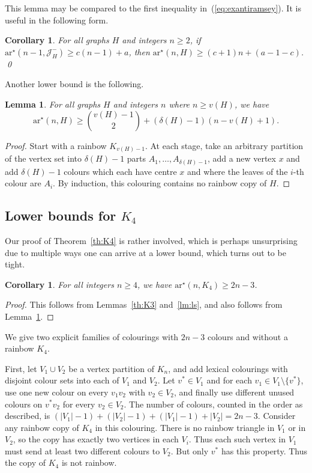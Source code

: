 \documentclass[a4paper, 12pt]{article}
\numberwithin{equation}{section}
\newtheorem{corollary}[theorem]{Corollary}
\newtheorem{lemma}[theorem]{Lemma}
\def\sm{{\setminus}}
\def\sar{{\mathrm{ar}^{\star}}}
\newcommand{\mc}[1]{\mathcal{#1}}
\begin{document}
This lemma may be compared to the first inequality in~(\ref{eq:exantiramsey}).
It is useful in the following form. 

\begin{corollary}
	For all graphs $H$ and integers $n \geq 2$, if $\sar(n-1,\mc{J}^-_H)\geq c (n-1)+a$, then $\sar(n,H)\geq (c+1)n+(a-1-c)$.
    \hfill\qed
\end{corollary}


Another lower bound is the following.

\begin{lemma}\label{lm:lowerbd2}
    For all graphs $H$ and integers $n$ where $n \geq v(H)$, we have
    $$
    \sar(n,H) \geq \binom{v(H)-1}{2}+(\delta(H)-1)(n-v(H)+1).
    $$
\end{lemma}

\begin{proof}
    Start with a rainbow $K_{v(H)-1}$. At each stage, take an arbitrary partition of the vertex set into $\delta(H)-1$ parts $A_1,\ldots,A_{\delta(H)-1}$, add a new vertex $x$ and add $\delta(H)-1$ colours which each have centre $x$ and where the leaves of the $i$-th colour are $A_i$. By induction, this colouring contains no rainbow copy of $H$.
\end{proof}

\subsection{Lower bounds for $K_4$}\label{sec:K4lower}

Our proof of Theorem~\ref{th:K4} is rather involved, which is perhaps unsurprising due to multiple ways one can arrive at a lower bound, which turns out to be tight.

\begin{corollary}\label{cor:K4}
	  For all integers $n \geq 4$, we have $\sar(n,K_4)\geq  2n -3$.
\end{corollary}

\begin{proof}
    This follows from Lemmas~\ref{th:K3} and~\ref{lm:ls},
    and also follows from Lemma~\ref{lm:lowerbd2}.
\end{proof}


We give two explicit families of colourings with $2n-3$ colours and without a rainbow $K_4$.


First, let $V_1 \cup V_2$ be a vertex partition of $K_n$, and add lexical colourings with disjoint colour sets into each of $V_1$ and $V_2$. Let $v^* \in V_1$ and for each $v_1 \in V_1\sm\{v^*\}$, use one new colour on every $v_1v_2$ with $v_2 \in V_2$, and finally use different unused colours on $v^*v_2$ for every $v_2 \in V_2$.
The number of colours, counted in the order as described, is $(|V_1|-1)+(|V_2|-1)+(|V_1|-1)+|V_2| = 2n-3$.
Consider any rainbow copy of $K_4$ in this colouring.
There is no rainbow triangle in $V_1$ or in $V_2$, so the copy has exactly two vertices in each $V_i$.
Thus each such vertex in $V_1$ must send at least two different colours to $V_2$. 
But only $v^*$ has this property. Thus the copy of $K_4$ is not rainbow. 
\end{document}
